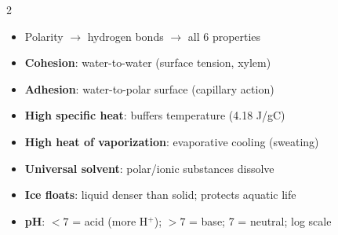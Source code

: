 \documentclass[11pt, letterpaper]{article}
\begin{document}
\begin{tcolorbox}[colback=part2bg, colframe=sectiongreen,
  title={\bfseries Properties of Water \& pH}, arc=3pt, boxrule=1pt]
\footnotesize
\begin{multicols}{2}
\begin{itemize}[noitemsep, leftmargin=*]
  \item Polarity $\to$ hydrogen bonds $\to$ all 6 properties
  \item \textbf{Cohesion}: water-to-water (surface tension, xylem)
  \item \textbf{Adhesion}: water-to-polar surface (capillary action)
  \item \textbf{High specific heat}: buffers temperature (4.18 J/g\textdegree C)
\end{itemize}
\columnbreak
\begin{itemize}[noitemsep, leftmargin=*]
  \item \textbf{High heat of vaporization}: evaporative cooling (sweating)
  \item \textbf{Universal solvent}: polar/ionic substances dissolve
  \item \textbf{Ice floats}: liquid denser than solid; protects aquatic life
  \item \textbf{pH}: $<7$ = acid (more H$^+$); $>7$ = base; 7 = neutral; log scale
\end{itemize}
\end{multicols}
\end{tcolorbox}

\vspace{4pt}
\end{document}
